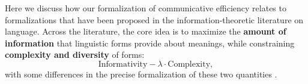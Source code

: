 \documentclass[10pt,twoside,lineno]{article}
\newcommand{\key}[1]{\textbf{#1}}
\begin{document}

Here we discuss how our formalization of communicative efficiency relates to formalizations that have been proposed in the information-theoretic literature on language.
Across the literature, the core idea is to maximize the \key{amount of information} that linguistic forms provide about meanings, while constraining \key{complexity and diversity} of forms:
\begin{equation}\label{eq:eff-basic}
\text{Informativity} - \lambda \cdot \text{Complexity},
\end{equation}
with some differences in the precise formalization of these two quantities \cite{ferreri2003least,ferrericancho2007global,kemp2012kinship,frank2012predicting,goodman2013knowledge,kao2014nonliteral,xu2014numeral,kirby2015compression,regier2015word,xu2016historical,futrell2017memory,zaslavsky2018efficient,bennett2018extremely,hahn2018information, peloquin2019interactions,zaslavsky2019semantic}.
\end{document}
